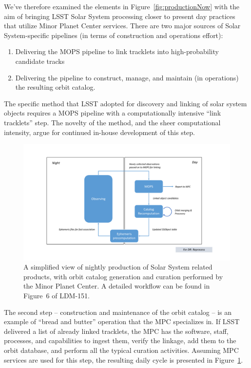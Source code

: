 \documentclass[DM,authoryear,toc,lsstdraft]{lsstdoc}
\begin{document}
We've therefore examined the elements in Figure~\ref{fig:productionNow} with the aim of bringing LSST Solar System processing closer to present day practices that utilize Minor Planet Center services. There are two major sources of Solar System-specific pipelines (in terms of construction and operations effort):
\begin{enumerate}
	\item Delivering the MOPS pipeline to link tracklets into high-probability candidate tracks
	\item Delivering the pipeline to construct, manage, and maintain (in operations) the resulting orbit catalog.
\end{enumerate}
The specific method that LSST adopted for discovery and linking of solar system objects requires a MOPS pipeline with a computationally intensive ``link tracklets'' step. The novelty of the method, and the sheer computational intensity, argue for continued in-house development of this step.

\begin{figure}
	\caption{A simplified view of nightly production of Solar System related products, with orbit catalog generation and curation performed by the Minor Planet Center. A detailed workflow can be found in Figure~6 of LDM-151.\label{fig:productionNew}}
	\centering
	\includegraphics[page=2,width=1.0\textwidth]{figures/processing.pdf}
\end{figure}

The second step -- construction and maintenance of the orbit catalog -- is an example of ``bread and butter'' operation that the MPC specializes in. If LSST delivered a list of already linked tracklets, the MPC has the software, staff,  processes, and capabilities to ingest them, verify the linkage, add them to the orbit database, and perform all the typical curation activities. Assuming MPC services are used for this step, the resulting daily cycle is presented in Figure~\ref{fig:productionNew}.
\end{document}
